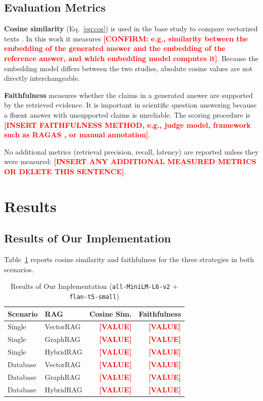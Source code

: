 \documentclass[conference]{IEEEtran}
\newcommand{\ph}[1]{\textbf{\textcolor{red}{[#1]}}}
\begin{document}
\subsection{Evaluation Metrics}
\textbf{Cosine similarity} (Eq.~\ref{eq:cos}) is used in the base study to compare vectorized texts \cite{ghanadian2026base}. In this work it measures \ph{CONFIRM: e.g., similarity between the embedding of the generated answer and the embedding of the reference answer, and which embedding model computes it}. Because the embedding model differs between the two studies, absolute cosine values are not directly interchangeable.

\textbf{Faithfulness} measures whether the claims in a generated answer are supported by the retrieved evidence. It is important in scientific question answering because a fluent answer with unsupported claims is unreliable. The scoring procedure is \ph{INSERT FAITHFULNESS METHOD, e.g., judge model, framework such as RAGAS \cite{es2024ragas}, or manual annotation}.

No additional metrics (retrieval precision, recall, latency) are reported unless they were measured: \ph{INSERT ANY ADDITIONAL MEASURED METRICS OR DELETE THIS SENTENCE}.

\section{Results}
\subsection{Results of Our Implementation}
Table~\ref{tab:ours} reports cosine similarity and faithfulness for the three strategies in both scenarios.

\begin{table}[t]
\caption{Results of Our Implementation (\texttt{all-MiniLM-L6-v2} + \texttt{flan-t5-small})}
\label{tab:ours}
\centering
\small
\begin{tabular}{llrr}
\toprule
Scenario & RAG & Cosine Sim. & Faithfulness \\
\midrule
Single & VectorRAG & \ph{VALUE} & \ph{VALUE} \\
Single & GraphRAG  & \ph{VALUE} & \ph{VALUE} \\
Single & HybridRAG & \ph{VALUE} & \ph{VALUE} \\
Database & VectorRAG & \ph{VALUE} & \ph{VALUE} \\
Database & GraphRAG  & \ph{VALUE} & \ph{VALUE} \\
Database & HybridRAG & \ph{VALUE} & \ph{VALUE} \\
\bottomrule
\end{tabular}
\end{table}
\end{document}
